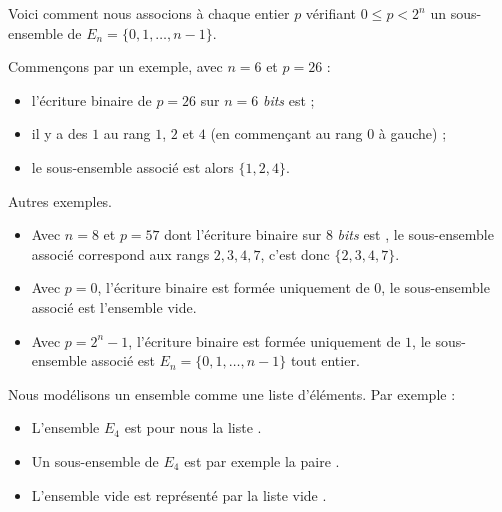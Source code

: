 \documentclass[11pt,class=report,crop=false]{standalone}
\begin{document}
\begin{activite}


Voici comment nous associons à chaque entier $p$ vérifiant $0 \le p < 2^n$ un sous-ensemble de $E_n = \{0,1,\ldots, n-1\}$.

Commençons par un exemple, avec $n = 6$ et $p=26$ :
\begin{itemize}
  \item l'écriture binaire de $p=26$ sur $n=6$ \emph{bits} est 
  \ci[0,1,1,0,1,0] ;
  \item il y a des $1$ au rang $1$, $2$ et $4$ (en commençant au rang $0$ à gauche) ;
  \item le sous-ensemble associé est alors $\{1,2,4\}$.
\end{itemize}




\bigskip

Autres exemples.
\begin{itemize}
  \item Avec $n = 8$ et $p = 57$ dont l'écriture binaire sur $8$ \emph{bits} est \ci{[0,0,1,1,1,0,0,1]}, le sous-ensemble associé correspond aux rangs $2,3,4,7$, c'est donc $\{2,3,4,7\}$.
  
  \smallskip
  

  
  \item Avec $p=0$, l'écriture binaire est formée uniquement de $0$, le sous-ensemble associé est l'ensemble vide.
  \item Avec $p = 2^n - 1$, l'écriture binaire est formée uniquement de $1$, le sous-ensemble associé est $E_n = \{0,1,\ldots, n-1\}$ tout entier.
\end{itemize}

\bigskip

Nous modélisons un ensemble comme une liste d'éléments.
Par exemple :
\begin{itemize}
  \item L'ensemble $E_4$ est pour nous la liste \ci{[0,1,2,3]}.
  \item Un sous-ensemble de $E_4$ est par exemple la paire \ci{[1,3]}.
  \item L'ensemble vide est représenté par la liste vide \ci{[]}.
\end{itemize}




\end{activite}
\end{document}
